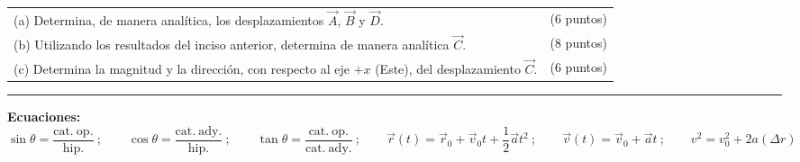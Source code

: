 \documentclass[9pt]{article}
\newcommand{\vect}[1]{\vec{#1}}
\begin{document}
\vspace{0.5mm}
\begin{tabularx}{\textwidth}{@{}>{\raggedright\arraybackslash}X>{\raggedleft\arraybackslash}p{25mm}@{}}
(a) Determina, de manera analítica, los desplazamientos $\vect{A}$, $\vect{B}$ y $\vect{D}$. & (6 puntos)\\[-0.15mm]
(b) Utilizando los resultados del inciso anterior, determina de manera analítica $\vect{C}$. & (8 puntos)\\[-0.15mm]
(c) Determina la magnitud y la dirección, con respecto al eje $+x$ (Este), del desplazamiento $\vect{C}$. & (6 puntos)
\end{tabularx}

\vspace{0.55mm}\hrule height 0.45pt\vspace{0.65mm}
\textbf{Ecuaciones:}
\vspace{0.15mm}
\[
\sin\theta=\frac{\mathrm{cat.\ op.}}{\mathrm{hip.}}\ ;\qquad
\cos\theta=\frac{\mathrm{cat.\ ady.}}{\mathrm{hip.}}\ ;\qquad
\tan\theta=\frac{\mathrm{cat.\ op.}}{\mathrm{cat.\ ady.}}\ ;\qquad
\vect{r}(t)=\vect{r}_0+\vect{v}_0t+\frac{1}{2}\vect{a}t^2\ ;\qquad
\vect{v}(t)=\vect{v}_0+\vect{a}t\ ;\qquad
v^2=v_0^2+2a(\Delta r)
\]
\end{document}
